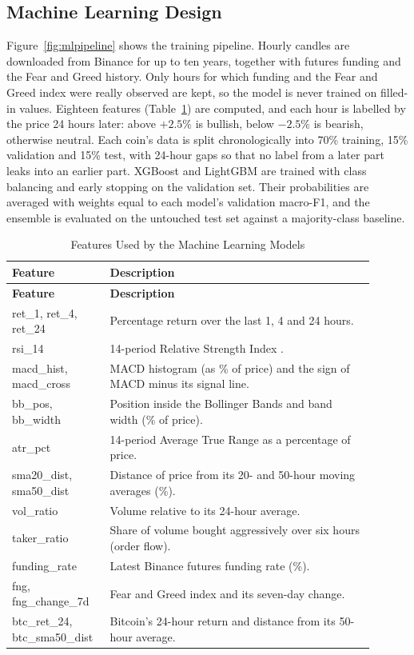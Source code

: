 \subsection{Machine Learning Design}
Figure~\ref{fig:mlpipeline} shows the training pipeline. Hourly candles are downloaded from Binance for up to ten years, together with futures funding and the Fear and Greed history. Only hours for which funding and the Fear and Greed index were really observed are kept, so the model is never trained on filled-in values. Eighteen features (Table~\ref{tab:features}) are computed, and each hour is labelled by the price 24 hours later: above $+2.5\%$ is bullish, below $-2.5\%$ is bearish, otherwise neutral. Each coin's data is split chronologically into 70\% training, 15\% validation and 15\% test, with 24-hour gaps so that no label from a later part leaks into an earlier part. XGBoost and LightGBM are trained with class balancing and early stopping on the validation set. Their probabilities are averaged with weights equal to each model's validation macro-F1, and the ensemble is evaluated on the untouched test set against a majority-class baseline.


{\renewcommand{\arraystretch}{1.25}
\begin{longtable}{|p{0.22\linewidth}|p{0.68\linewidth}|}
\caption{Features Used by the Machine Learning Models}\label{tab:features}\\\hline
\textbf{Feature} & \textbf{Description}\\\hline\endfirsthead
\hline\textbf{Feature} & \textbf{Description}\\\hline\endhead
ret\_1, ret\_4, ret\_24 & Percentage return over the last 1, 4 and 24 hours.\\\hline
rsi\_14 & 14-period Relative Strength Index \cite{wilder1978}.\\\hline
macd\_hist, macd\_cross & MACD histogram (as \% of price) and the sign of MACD minus its signal line.\\\hline
bb\_pos, bb\_width & Position inside the Bollinger Bands and band width (\% of price).\\\hline
atr\_pct & 14-period Average True Range \cite{wilder1978} as a percentage of price.\\\hline
sma20\_dist, sma50\_dist & Distance of price from its 20- and 50-hour moving averages (\%).\\\hline
vol\_ratio & Volume relative to its 24-hour average.\\\hline
taker\_ratio & Share of volume bought aggressively over six hours (order flow).\\\hline
funding\_rate & Latest Binance futures funding rate (\%).\\\hline
fng, fng\_change\_7d & Fear and Greed index and its seven-day change.\\\hline
btc\_ret\_24, btc\_sma50\_dist & Bitcoin's 24-hour return and distance from its 50-hour average.\\\hline
\end{longtable}}


